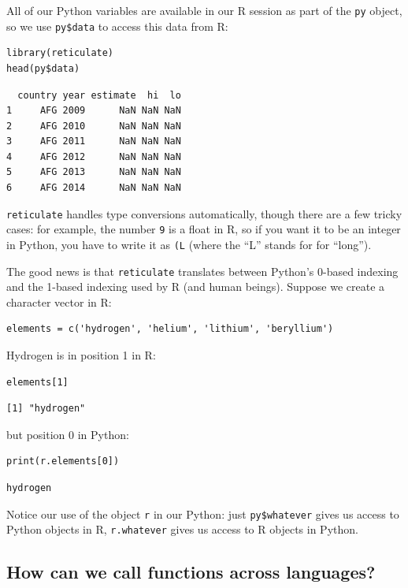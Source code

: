 All of our Python variables are available in our R session as part of the \texttt{py} object,
so we use \texttt{py\$data} to access this data from R:

\begin{lstlisting}
library(reticulate)
head(py$data)
\end{lstlisting}

\begin{lstlisting}
  country year estimate  hi  lo
1     AFG 2009      NaN NaN NaN
2     AFG 2010      NaN NaN NaN
3     AFG 2011      NaN NaN NaN
4     AFG 2012      NaN NaN NaN
5     AFG 2013      NaN NaN NaN
6     AFG 2014      NaN NaN NaN
\end{lstlisting}

\texttt{reticulate} handles type conversions automatically,
though there are a few tricky cases:
for example,
the number \texttt{9} is a float in R,
so if you want it to be an integer in Python,
you have to write it as \texttt{(L}
(where the ``L'' stands for for ``long'').

The good news is that
\texttt{reticulate} translates between Python's 0-based indexing
and the 1-based indexing used by R (and human beings).
Suppose we create a character vector in R:

\begin{lstlisting}
elements = c('hydrogen', 'helium', 'lithium', 'beryllium')
\end{lstlisting}

\noindent
Hydrogen is in position 1 in R:

\begin{lstlisting}
elements[1]
\end{lstlisting}

\begin{lstlisting}
[1] "hydrogen"
\end{lstlisting}

\noindent
but position 0 in Python:

\begin{lstlisting}
print(r.elements[0])
\end{lstlisting}

\begin{lstlisting}
hydrogen
\end{lstlisting}

\noindent
Notice our use of the object \texttt{r} in our Python:
just \texttt{py\$whatever} gives us access to Python objects in R,
\texttt{r.whatever} gives us access to R objects in Python.

\subsection*{How can we call functions across languages?}


